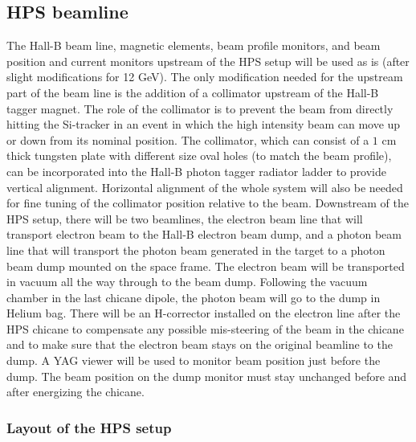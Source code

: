  \subsection{HPS beamline}
 \label{setup:beamline}
 
The Hall-B beam line, magnetic elements, beam profile monitors, and beam position and current monitors upstream of the HPS setup will be 
used as is (after slight modifications for 12 GeV). The only modification needed for the upstream part of the beam line is the addition of 
a collimator upstream of the Hall-B tagger magnet. The role of the collimator is to prevent the beam from directly hitting the Si-tracker in an 
event in which the high intensity beam can move up or down from its nominal position. The collimator, which  can consist of  a $1$ cm 
thick tungsten plate with different size oval holes (to match the beam profile), can be incorporated into the Hall-B photon tagger radiator ladder 
to provide vertical alignment. Horizontal alignment of the whole system will also be needed for fine tuning of the collimator position 
relative to the beam. Downstream of the HPS setup, there will be two beamlines, the electron beam line that will transport electron beam to the 
Hall-B electron beam dump, and a photon beam line that will transport the photon beam generated in the target to a photon beam dump mounted 
on the space frame. The electron beam will be transported in vacuum all the way through to the beam dump. Following the vacuum 
chamber in the last chicane dipole, the photon beam will go to the dump in Helium bag. There will be an H-corrector installed on the electron 
line after 
the HPS chicane to compensate any possible mis-steering of the beam in the chicane and to make sure that the electron beam stays on the 
original beamline to the dump. A YAG viewer will be used to monitor beam position just before the dump. The beam position on the dump monitor 
must stay unchanged before and after energizing the chicane.  
 
 \subsubsection{Layout of the HPS setup} 
 \label{setup:layout}
 
